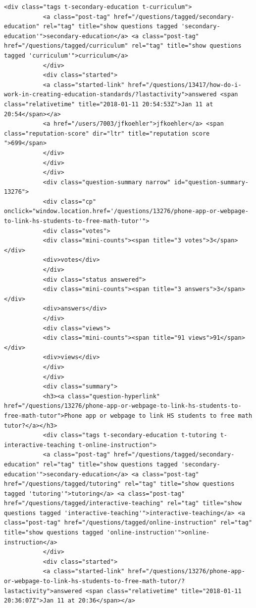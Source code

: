 \documentclass[11pt]{article}
\begin{document}
\begin{Verbatim}[commandchars=\\\{\}]
           <div class="tags t-secondary-education t-curriculum">
           <a class="post-tag" href="/questions/tagged/secondary-education" rel="tag" title="show questions tagged 'secondary-education'">secondary-education</a> <a class="post-tag" href="/questions/tagged/curriculum" rel="tag" title="show questions tagged 'curriculum'">curriculum</a>
           </div>
           <div class="started">
           <a class="started-link" href="/questions/13417/how-do-i-work-in-creating-education-standards/?lastactivity">answered <span class="relativetime" title="2018-01-11 20:54:53Z">Jan 11 at 20:54</span></a>
           <a href="/users/7003/jfkoehler">jfkoehler</a> <span class="reputation-score" dir="ltr" title="reputation score ">699</span>
           </div>
           </div>
           </div>
           <div class="question-summary narrow" id="question-summary-13276">
           <div class="cp" onclick="window.location.href='/questions/13276/phone-app-or-webpage-to-link-hs-students-to-free-math-tutor'">
           <div class="votes">
           <div class="mini-counts"><span title="3 votes">3</span></div>
           <div>votes</div>
           </div>
           <div class="status answered">
           <div class="mini-counts"><span title="3 answers">3</span></div>
           <div>answers</div>
           </div>
           <div class="views">
           <div class="mini-counts"><span title="91 views">91</span></div>
           <div>views</div>
           </div>
           </div>
           <div class="summary">
           <h3><a class="question-hyperlink" href="/questions/13276/phone-app-or-webpage-to-link-hs-students-to-free-math-tutor">Phone app or webpage to link HS students to free math tutor?</a></h3>
           <div class="tags t-secondary-education t-tutoring t-interactive-teaching t-online-instruction">
           <a class="post-tag" href="/questions/tagged/secondary-education" rel="tag" title="show questions tagged 'secondary-education'">secondary-education</a> <a class="post-tag" href="/questions/tagged/tutoring" rel="tag" title="show questions tagged 'tutoring'">tutoring</a> <a class="post-tag" href="/questions/tagged/interactive-teaching" rel="tag" title="show questions tagged 'interactive-teaching'">interactive-teaching</a> <a class="post-tag" href="/questions/tagged/online-instruction" rel="tag" title="show questions tagged 'online-instruction'">online-instruction</a>
           </div>
           <div class="started">
           <a class="started-link" href="/questions/13276/phone-app-or-webpage-to-link-hs-students-to-free-math-tutor/?lastactivity">answered <span class="relativetime" title="2018-01-11 20:36:07Z">Jan 11 at 20:36</span></a>

\end{Verbatim}
\end{document}
